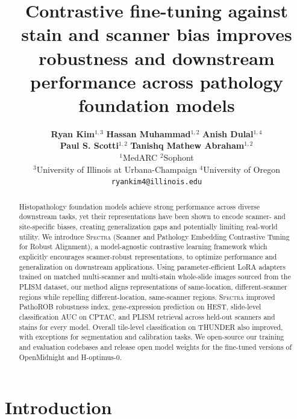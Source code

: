 \documentclass{article}
\title{Contrastive fine-tuning against stain and scanner bias improves robustness and downstream performance across pathology foundation models}
\author{%
  \textbf{Ryan Kim}$^{1,3}$ \quad \textbf{Hassan Muhammad}$^{1,2}$ \quad \textbf{Anish Dulal}$^{1,4}$ \\
  \textbf{Paul S. Scotti}$^{1,2}$ \quad \textbf{Tanishq Mathew Abraham}$^{1,2}$ \\[3pt]
  $^1$MedARC \quad $^2$Sophont \\
  $^3$University of Illinois at Urbana-Champaign \quad $^4$University of Oregon \\
  \texttt{ryankim4@illinois.edu}
}
\begin{document}
\maketitle

\begin{abstract}
Histopathology foundation models achieve strong performance across diverse downstream tasks, yet their representations have been shown to encode scanner- and site-specific biases, creating generalization gaps and potentially limiting real-world utility. We introduce \textsc{Spectra} (Scanner and Pathology Embedding Contrastive Tuning for Robust Alignment), a model-agnostic contrastive learning framework which explicitly encourages scanner-robust representations, to optimize performance and generalization on downstream applications. Using parameter-efficient LoRA adapters trained on matched multi-scanner and multi-stain whole-slide images sourced from the PLISM dataset, our method aligns representations of same-location, different-scanner regions while repelling different-location, same-scanner regions. \textsc{Spectra} improved PathoROB robustness index, gene-expression prediction on HEST, slide-level classification AUC on CPTAC, and PLISM retrieval across held-out scanners and stains for every model.  Overall tile-level classification on THUNDER also improved, with exceptions for segmentation and calibration tasks.  We open-source our  training and evaluation codebases and release open model weights for the fine-tuned versions of OpenMidnight and H-optimus-0.
\end{abstract}

\section{Introduction}
\end{document}
